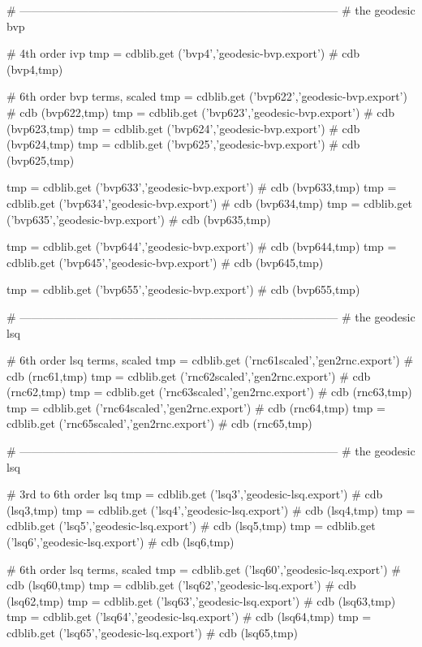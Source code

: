 \documentclass[12pt]{cdblatex}
\begin{document}
\begin{cadabra}
   # ------------------------------------------------------------------------------------
   # the geodesic bvp

   # 4th order ivp
   tmp = cdblib.get ('bvp4','geodesic-bvp.export')  # cdb (bvp4,tmp)

   # 6th order bvp terms, scaled
   tmp = cdblib.get ('bvp622','geodesic-bvp.export')  # cdb (bvp622,tmp)
   tmp = cdblib.get ('bvp623','geodesic-bvp.export')  # cdb (bvp623,tmp)
   tmp = cdblib.get ('bvp624','geodesic-bvp.export')  # cdb (bvp624,tmp)
   tmp = cdblib.get ('bvp625','geodesic-bvp.export')  # cdb (bvp625,tmp)

   tmp = cdblib.get ('bvp633','geodesic-bvp.export')  # cdb (bvp633,tmp)
   tmp = cdblib.get ('bvp634','geodesic-bvp.export')  # cdb (bvp634,tmp)
   tmp = cdblib.get ('bvp635','geodesic-bvp.export')  # cdb (bvp635,tmp)

   tmp = cdblib.get ('bvp644','geodesic-bvp.export')  # cdb (bvp644,tmp)
   tmp = cdblib.get ('bvp645','geodesic-bvp.export')  # cdb (bvp645,tmp)

   tmp = cdblib.get ('bvp655','geodesic-bvp.export')  # cdb (bvp655,tmp)

   # ------------------------------------------------------------------------------------
   # the geodesic lsq

   # 6th order lsq terms, scaled
   tmp = cdblib.get ('rnc61scaled','gen2rnc.export')  # cdb (rnc61,tmp)
   tmp = cdblib.get ('rnc62scaled','gen2rnc.export')  # cdb (rnc62,tmp)
   tmp = cdblib.get ('rnc63scaled','gen2rnc.export')  # cdb (rnc63,tmp)
   tmp = cdblib.get ('rnc64scaled','gen2rnc.export')  # cdb (rnc64,tmp)
   tmp = cdblib.get ('rnc65scaled','gen2rnc.export')  # cdb (rnc65,tmp)

   # ------------------------------------------------------------------------------------
   # the geodesic lsq

   # 3rd to 6th order lsq
   tmp = cdblib.get ('lsq3','geodesic-lsq.export')  # cdb (lsq3,tmp)
   tmp = cdblib.get ('lsq4','geodesic-lsq.export')  # cdb (lsq4,tmp)
   tmp = cdblib.get ('lsq5','geodesic-lsq.export')  # cdb (lsq5,tmp)
   tmp = cdblib.get ('lsq6','geodesic-lsq.export')  # cdb (lsq6,tmp)

   # 6th order lsq terms, scaled
   tmp = cdblib.get ('lsq60','geodesic-lsq.export')  # cdb (lsq60,tmp)
   tmp = cdblib.get ('lsq62','geodesic-lsq.export')  # cdb (lsq62,tmp)
   tmp = cdblib.get ('lsq63','geodesic-lsq.export')  # cdb (lsq63,tmp)
   tmp = cdblib.get ('lsq64','geodesic-lsq.export')  # cdb (lsq64,tmp)
   tmp = cdblib.get ('lsq65','geodesic-lsq.export')  # cdb (lsq65,tmp)


\end{cadabra}
\end{document}
